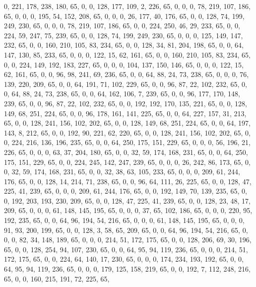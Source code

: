 \begin{DoxyCode}
       0, 221, 178, 238, 180, 65, 0, 0, 128, 177, 109, 2, 226, 65, 0, 0, 0, 78, 219, 107, 186, 65, 0, 0, 0, 195,
       54, 152, 208, 65, 0, 0, 0, 26, 177, 40, 176, 65, 0, 0, 128, 74, 199, 249, 230, 65, 0, 0, 0, 78, 219, 107,
       186, 65, 0, 0, 224, 250, 46, 29, 233, 65, 0, 0, 224, 59, 247, 75, 239, 65, 0, 0, 128, 74, 199, 249, 230, 65, 0,
       0, 0, 125, 149, 147, 232, 65, 0, 0, 160, 210, 105, 83, 234, 65, 0, 0, 128, 34, 81, 204, 198, 65, 0, 0, 64,
       147, 130, 85, 233, 65, 0, 0, 0, 122, 15, 62, 161, 65, 0, 0, 160, 210, 105, 83, 234, 65, 0, 0, 224, 149, 192,
       183, 227, 65, 0, 0, 0, 104, 137, 150, 146, 65, 0, 0, 0, 122, 15, 62, 161, 65, 0, 0, 96, 98, 241, 69, 236,
       65, 0, 0, 64, 88, 24, 73, 238, 65, 0, 0, 0, 76, 139, 220, 209, 65, 0, 0, 64, 191, 71, 102, 229, 65, 0, 0, 96,
       87, 22, 102, 232, 65, 0, 0, 64, 88, 24, 73, 238, 65, 0, 0, 64, 162, 106, 7, 239, 65, 0, 0, 96, 177, 170,
       148, 239, 65, 0, 0, 96, 87, 22, 102, 232, 65, 0, 0, 192, 192, 170, 135, 221, 65, 0, 0, 128, 149, 68, 251, 224,
       65, 0, 0, 96, 178, 161, 141, 225, 65, 0, 0, 64, 227, 157, 31, 213, 65, 0, 0, 128, 241, 156, 102, 202, 65,
       0, 0, 128, 149, 68, 251, 224, 65, 0, 0, 64, 197, 143, 8, 212, 65, 0, 0, 192, 90, 221, 62, 220, 65, 0, 0, 128,
       241, 156, 102, 202, 65, 0, 0, 224, 216, 136, 196, 235, 65, 0, 0, 64, 250, 175, 151, 229, 65, 0, 0, 0, 56,
       196, 21, 226, 65, 0, 0, 0, 63, 37, 204, 180, 65, 0, 0, 32, 59, 174, 168, 231, 65, 0, 0, 64, 250, 175, 151,
       229, 65, 0, 0, 224, 245, 142, 247, 239, 65, 0, 0, 0, 26, 242, 86, 173, 65, 0, 0, 32, 59, 174, 168, 231, 65, 0,
       0, 32, 38, 63, 105, 233, 65, 0, 0, 0, 209, 61, 244, 176, 65, 0, 0, 128, 14, 214, 71, 238, 65, 0, 0, 96, 64,
       111, 26, 225, 65, 0, 0, 128, 47, 225, 41, 239, 65, 0, 0, 0, 209, 61, 244, 176, 65, 0, 0, 192, 149, 70, 139,
       235, 65, 0, 0, 192, 203, 193, 230, 209, 65, 0, 0, 128, 47, 225, 41, 239, 65, 0, 0, 128, 23, 48, 17, 209,
       65, 0, 0, 0, 61, 148, 145, 195, 65, 0, 0, 0, 37, 65, 102, 186, 65, 0, 0, 0, 220, 95, 192, 235, 65, 0, 0, 64,
       96, 194, 54, 216, 65, 0, 0, 0, 61, 148, 145, 195, 65, 0, 0, 0, 91, 93, 200, 199, 65, 0, 0, 128, 3, 58, 65,
       209, 65, 0, 0, 64, 96, 194, 54, 216, 65, 0, 0, 0, 82, 34, 148, 189, 65, 0, 0, 0, 214, 51, 172, 175, 65, 0, 0,
       128, 206, 69, 30, 196, 65, 0, 0, 128, 254, 94, 107, 230, 65, 0, 0, 64, 95, 94, 119, 236, 65, 0, 0, 0, 214,
       51, 172, 175, 65, 0, 0, 224, 64, 140, 17, 230, 65, 0, 0, 0, 174, 234, 193, 192, 65, 0, 0, 64, 95, 94, 119,
       236, 65, 0, 0, 0, 179, 125, 158, 219, 65, 0, 0, 192, 7, 112, 248, 216, 65, 0, 0, 160, 215, 191, 72, 225, 65,

\end{DoxyCode}
